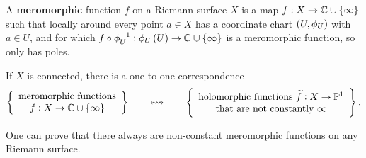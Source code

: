 A \textbf{meromorphic} function $ f $ on a Riemann surface $ X $ is a map $ f : X \to \CC \cup \cbr{\infty} $ such that locally around every point $ a \in X $ has a coordinate chart $ \br{U, \phi_U} $ with $ a \in U $, and for which $ f \circ \phi_U^{-1} : \phi_U\br{U} \to \CC \cup \cbr{\infty} $ is a meromorphic function, so only has poles.

\begin{lemma}
If $ X $ is connected, there is a one-to-one correspondence
$$ \correspondence{\text{meromorphic functions} \\ f : X \to \CC \cup \cbr{\infty}}{\text{holomorphic functions} \ \widetilde{f} : X \to \PP^1 \\ \text{that are not constantly} \ \infty}. $$
\end{lemma}

\begin{fact**}
One can prove that there always are non-constant meromorphic functions on any Riemann surface.
\end{fact**}

